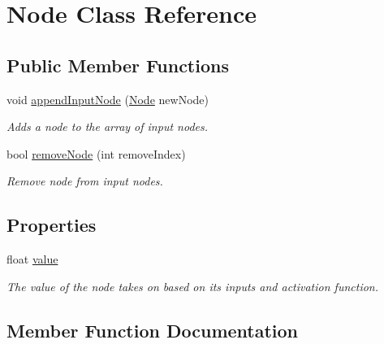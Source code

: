 \hypertarget{class_node}{}\section{Node Class Reference}
\label{class_node}
\subsection*{Public Member Functions}
\begin{DoxyCompactItemize}
\item 
void \mbox{\hyperlink{class_node_a6700b2928da6ac5fcac8431d6f16597e}{append\+Input\+Node}} (\mbox{\hyperlink{class_node}{Node}} new\+Node)
\begin{DoxyCompactList}\small\item\em Adds a node to the array of input nodes. \end{DoxyCompactList}\item 
bool \mbox{\hyperlink{class_node_ae35ca95be4806e6a3f81617d888f724f}{remove\+Node}} (int remove\+Index)
\begin{DoxyCompactList}\small\item\em Remove node from input nodes. \end{DoxyCompactList}\end{DoxyCompactItemize}
\subsection*{Properties}
\begin{DoxyCompactItemize}
\item 
float \mbox{\hyperlink{class_node_a4d82b89fd1d72cc0184763279a3811dc}{value}}
\begin{DoxyCompactList}\small\item\em The value of the node takes on based on it\textquotesingle{}s inputs and activation function. \end{DoxyCompactList}\end{DoxyCompactItemize}


\subsection{Member Function Documentation}
\mbox{\label{class_node_a6700b2928da6ac5fcac8431d6f16597e}} 
